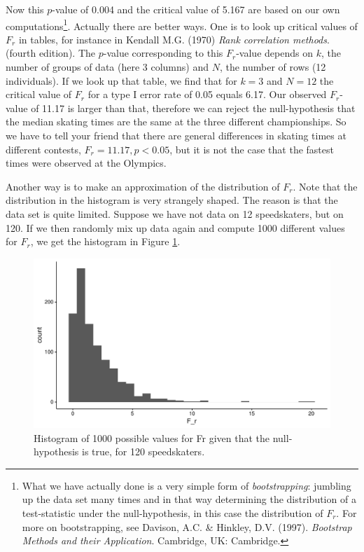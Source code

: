 \documentclass[]{book}\usepackage[]{graphicx}\usepackage[]{color}
\makeatletter
\def\maxwidth{ %
  \ifdim\Gin@nat@width>\linewidth
    \linewidth
  \else
    \Gin@nat@width
  \fi
}
\newenvironment{knitrout}{}{} %
\makeatother
\begin{document}
Now this $p$-value of 0.004 and the critical value of 5.167 are based on our own computations\footnote{What we have actually done is a very simple form of \textit{bootstrapping}: jumbling up the data set many times and in that way determining the distribution of a test-statistic under the null-hypothesis, in this case the distribution of $F_r$. For more on bootstrapping, see Davison, A.C. \& Hinkley, D.V. (1997). \textit{Bootstrap Methods and their Application}. Cambridge, UK: Cambridge.}. Actually there are better ways. One is to look up critical values of $F_r$ in tables, for instance in Kendall M.G. (1970) \textit{Rank correlation methods}. (fourth edition). The $p$-value corresponding to this $F_r$-value depends on $k$, the number of groups of data (here 3 columns) and $N$, the number of rows (12 individuals). If we look up that table, we find that for $k=3$ and $N=12$ the critical value of $F_r$ for a type I error rate of 0.05 equals 6.17. Our observed $F_r$-value of 11.17 is larger than that, therefore we can reject the null-hypothesis that the median skating times are the same at the three different championships. So we have to tell your friend that there are general differences in skating times at different contests, $F_r=11.17, p < 0.05$, but it is not the case that the fastest times were observed at the Olympics.

Another way is to make an approximation of the distribution of $F_r$. Note that the distribution in the histogram is very strangely shaped. The reason is that the data set is quite limited. Suppose we have not data on 12 speedskaters, but on 120. If we then randomly mix up data again and compute 1000 different values for $F_r$, we get the histogram in Figure \ref{fig:nonparmixed_46}.


\begin{knitrout}
\color{fgcolor}\begin{figure}

{\centering \includegraphics[width=\maxwidth]{figure/nonparmixed_46-1} 

}

\caption[Histogram of 1000 possible values for Fr given that the null-hypothesis is true, for 120 speedskaters]{Histogram of 1000 possible values for Fr given that the null-hypothesis is true, for 120 speedskaters.}\label{fig:nonparmixed_46}
\end{figure}


\end{knitrout}
\end{document}
